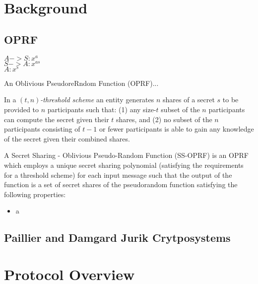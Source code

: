 \documentclass[10pt, sigconf]{acmart}
\begin{document}
\section{Background}

\subsection{OPRF}

$A -> S: x^a$ \\
$S -> A: x^{as}$ \\
$A: x^s$


	
\begin{definition}
	An Oblivious PseudoreRndom Function (OPRF)...
\end{definition}


\begin{definition}
	In a $(t,n)$\textit{-threshold scheme} an entity generates $n$ shares of a secret $s$ to be provided to $n$ participants such that: (1) any size-$t$ subset of the $n$ participants can compute the secret given their $t$ shares, and (2) no subset of the $n$ participants consisting of $t-1$ or fewer participants is able to gain any knowledge of the secret given their combined shares.
\end{definition}

\begin{definition}
	A Secret Sharing - Oblivious Pseudo-Random Function (SS-OPRF) is an OPRF which employs a unique secret sharing polynomial (satisfying the requirements for a threshold scheme) for each input message such that the output of the function is a set of secret shares of the pseudorandom function satisfying the following properties: 
	\begin{itemize}
		\item a
	\end{itemize} 
\end{definition}



\subsection{Paillier \cite{Paillier} and Damgard Jurik \cite{Damgard} Crytposystems}

\pagebreak
\section{Protocol Overview}

\end{document}
